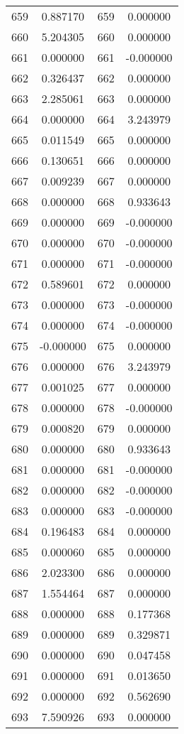 \documentclass[12pt]{article}
\begin{document}
\begin{longtable}{@{}cccc@{}}
659 & 0.887170 & 659 & 0.000000 \\
660 & 5.204305 & 660 & 0.000000 \\
661 & 0.000000 & 661 & -0.000000 \\
662 & 0.326437 & 662 & 0.000000 \\
663 & 2.285061 & 663 & 0.000000 \\
664 & 0.000000 & 664 & 3.243979 \\
665 & 0.011549 & 665 & 0.000000 \\
666 & 0.130651 & 666 & 0.000000 \\
667 & 0.009239 & 667 & 0.000000 \\
668 & 0.000000 & 668 & 0.933643 \\
669 & 0.000000 & 669 & -0.000000 \\
670 & 0.000000 & 670 & -0.000000 \\
671 & 0.000000 & 671 & -0.000000 \\
672 & 0.589601 & 672 & 0.000000 \\
673 & 0.000000 & 673 & -0.000000 \\
674 & 0.000000 & 674 & -0.000000 \\
675 & -0.000000 & 675 & 0.000000 \\
676 & 0.000000 & 676 & 3.243979 \\
677 & 0.001025 & 677 & 0.000000 \\
678 & 0.000000 & 678 & -0.000000 \\
679 & 0.000820 & 679 & 0.000000 \\
680 & 0.000000 & 680 & 0.933643 \\
681 & 0.000000 & 681 & -0.000000 \\
682 & 0.000000 & 682 & -0.000000 \\
683 & 0.000000 & 683 & -0.000000 \\
684 & 0.196483 & 684 & 0.000000 \\
685 & 0.000060 & 685 & 0.000000 \\
686 & 2.023300 & 686 & 0.000000 \\
687 & 1.554464 & 687 & 0.000000 \\
688 & 0.000000 & 688 & 0.177368 \\
689 & 0.000000 & 689 & 0.329871 \\
690 & 0.000000 & 690 & 0.047458 \\
691 & 0.000000 & 691 & 0.013650 \\
692 & 0.000000 & 692 & 0.562690 \\
693 & 7.590926 & 693 & 0.000000 \\

\end{longtable}
\end{document}
